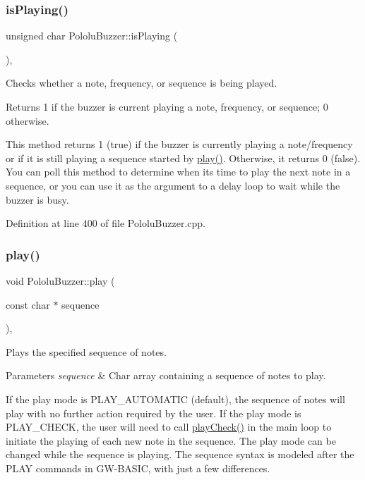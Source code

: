 \subsubsection{\texorpdfstring{is\+Playing()}{isPlaying()}}
{\footnotesize\ttfamily unsigned char Pololu\+Buzzer\+::is\+Playing (\begin{DoxyParamCaption}{ }\end{DoxyParamCaption})\hspace{0.3cm}{\ttfamily [static]}, {\ttfamily [inherited]}}



Checks whether a note, frequency, or sequence is being played. 

\begin{DoxyReturn}{Returns}
1 if the buzzer is current playing a note, frequency, or sequence; 0 otherwise.
\end{DoxyReturn}
This method returns 1 (true) if the buzzer is currently playing a note/frequency or if it is still playing a sequence started by {\ttfamily \hyperlink{class_pololu_buzzer_a22f45ef7cdf9dc8fc54e617244368277}{play()}}. Otherwise, it returns 0 (false). You can poll this method to determine when it\textquotesingle{}s time to play the next note in a sequence, or you can use it as the argument to a delay loop to wait while the buzzer is busy. 

Definition at line 400 of file Pololu\+Buzzer.\+cpp.

\mbox{\label{class_pololu_buzzer_a22f45ef7cdf9dc8fc54e617244368277}} 
\subsubsection{\texorpdfstring{play()}{play()}}
{\footnotesize\ttfamily void Pololu\+Buzzer\+::play (\begin{DoxyParamCaption}\item[{const char $\ast$}]{sequence }\end{DoxyParamCaption})\hspace{0.3cm}{\ttfamily [static]}, {\ttfamily [inherited]}}



Plays the specified sequence of notes. 


\begin{DoxyParams}{Parameters}
{\em sequence} & Char array containing a sequence of notes to play.\\
\hline
\end{DoxyParams}
If the play mode is {\ttfamily P\+L\+A\+Y\+\_\+\+A\+U\+T\+O\+M\+A\+T\+IC} (default), the sequence of notes will play with no further action required by the user. If the play mode is {\ttfamily P\+L\+A\+Y\+\_\+\+C\+H\+E\+CK}, the user will need to call {\ttfamily \hyperlink{class_pololu_buzzer_a427225dcc85c1e65078e4397b9890929}{play\+Check()}} in the main loop to initiate the playing of each new note in the sequence. The play mode can be changed while the sequence is playing. The sequence syntax is modeled after the P\+L\+AY commands in G\+W-\/\+B\+A\+S\+IC, with just a few differences.

